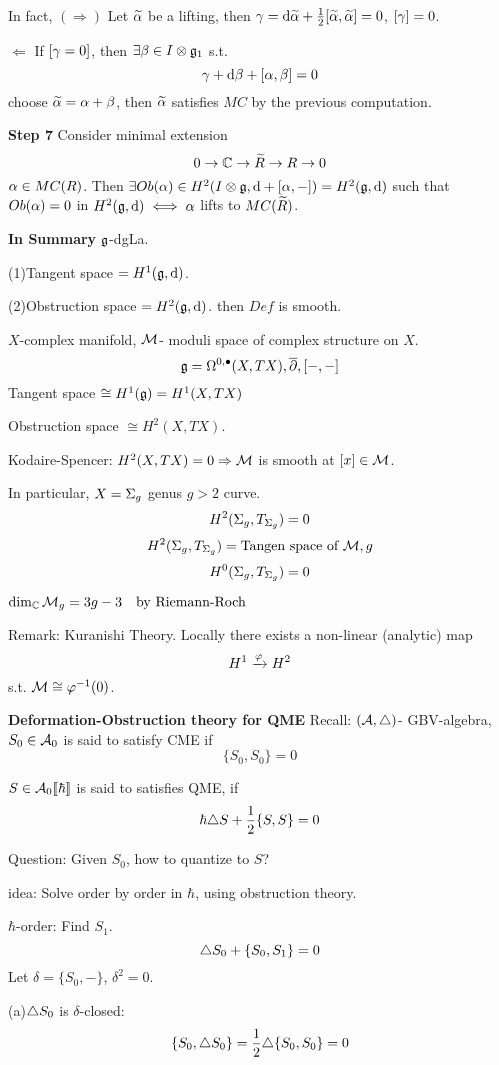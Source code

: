 In fact, $(\Rightarrow)$ Let $\widetilde{\alpha}$ be a lifting, then
$\gamma=\mathrm{d}\widetilde{\alpha}+\frac{1}{2}[\widetilde{\alpha},\widetilde{\alpha}]=0$, $[\gamma]=0$.

$\Leftarrow$ If $[\gamma=0]$, then $\exists\beta\in I\otimes\mathfrak{g}_1$ s.t.
$$\gamma+\mathrm{d}\beta+[\alpha,\beta]=0$$
choose $\widetilde{\alpha}=\alpha+\beta$, then $\widetilde{\alpha}$ satisfies $MC$
by the previous computation.

\textbf{Step 7} Consider minimal extension
$$0\to\mathbb{C}\to \widetilde{R}\to R\to 0$$
$\alpha\in MC(R)$. Then $\exists Ob(\alpha)\in H^2(I\otimes\mathfrak{g},\mathrm{d}+[\alpha,-])=H^2(\mathfrak{g},\mathrm{d})$
such that $Ob(\alpha)=0$ in $H^2(\mathfrak{g},\mathrm{d})\iff\alpha$ lifts to $MC(\widetilde{R})$.

\textbf{In Summary} $\mathfrak{g}$-dgLa.

(1)Tangent space $=H^1(\mathfrak{g},\mathrm{d})$.

(2)Obstruction space $=H^2(\mathfrak{g},\mathrm{d})$. then $Def$ is smooth.

\begin{example}$X$-complex manifold,
$\mathcal{M}$- moduli space of complex structure on $X$.
$$\mathfrak{g}=\Omega^{0,\bullet}(X,TX),\overline{\partial},[-,-]$$
Tangent space $\cong H^1(\mathfrak{g})=H^1(X,TX)$

Obstruction space $\cong H^2(X,TX)$.

Kodaire-Spencer: $H^2(X,TX)=0\Rightarrow \mathcal{M}$ is smooth at $[x]\in\mathcal{M}$.
\end{example}

In particular, $X=\Sigma_g$ genus $g>2$ curve.
$$H^2(\Sigma_g,T_{\Sigma_g})=0$$
$$H^2(\Sigma_g,T_{\Sigma_g})=\text{Tangen space of $\mathcal{M},g$}$$
$$H^0(\Sigma_g,T_{\Sigma_g})=0$$

$\dim_{\mathbb{C}}\mathcal{M}_g=3g-3\quad\text{by Riemann-Roch}$

Remark: Kuranishi Theory. Locally there exists a non-linear (analytic) map
$$H^1\xrightarrow{\varphi} H^2$$
s.t. $\mathcal{M}\cong\varphi^{-1}(0)$.

\textbf{Deformation-Obstruction theory for QME}
Recall: $(\mathcal{A},\triangle)$- GBV-algebra, $S_0\in\mathcal{A}_0$
is said to satisfy CME if
$$\{S_0,S_0\}=0$$

$S\in\mathcal{A}_0[\![\hbar]\!]$ is said to satisfies QME, if
$$\hbar\triangle S+\frac{1}{2}\{S,S\}=0$$

Question: Given $S_0$, how to quantize to $S$?

idea: Solve order by order in $\hbar$, using obstruction theory.

$\hbar$-order: Find $S_1$.
$$\triangle S_0+\{S_0,S_1\}=0$$
Let $\delta=\{S_0,-\}$, $\delta^2=0$.

(a)$\triangle S_0$ is $\delta$-closed:
$$\{S_0,\triangle S_0\}=\frac{1}{2}\triangle\{S_0,S_0\}=0$$

